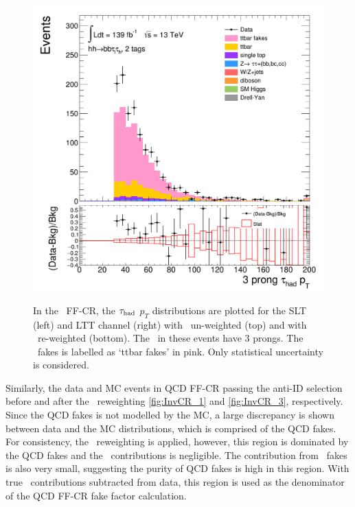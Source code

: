 \begin{figure}[htbp]
\includegraphics[width=.45\textwidth]{DiHiggs/plots/FF_CRs/ttbarCR_LTT_weighted/HNone/BDTVarsHighMbb/2/C_2tag2pjet_0ptv_TauPt3P.png}\\
\caption{In the \ttbar\ FF-CR, the $\tau_{\mathrm{had}}$ $p_T$ distributions are plotted 
for the SLT (left) and LTT channel (right) 
with \ttbar\ un-weighted (top) 
and with \ttbar\ re-weighted (bottom).
The \tauhad\ in these events have 3 prongs. 
The \ttbar\ fakes is labelled as `ttbar fakes' in pink.
Only statistical uncertainty is considered.
}
\label{fig:ttbarCR_3}
\end{figure} 



Similarly, the data and MC events in QCD FF-CR passing the anti-ID selection 
before and after the \ttbar\ reweighting 
\ref{fig:InvCR_1} and \ref{fig:InvCR_3}, respectively.
Since the QCD fakes is not modelled by the MC, a large discrepancy
is shown between data and the MC distributions, which is comprised
of the QCD fakes. 
For consistency, the \ttbar\ reweighting is applied, 
however, this region is dominated 
by the QCD fakes and the \ttbar\ contributions is negligible. 
The contribution from \ttbar\ fakes is also very small, suggesting 
the purity of QCD fakes is high in this region. 
With true \tauhad\ contributions subtracted from data, 
this region is used as the denominator of the QCD FF-CR fake factor calculation. 

